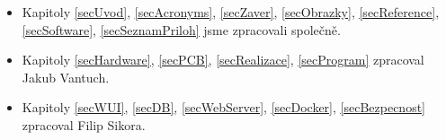 \documentclass[czech,12pt,a4paper]{article}
\begin{document}
\begin{itemize}
	\item Kapitoly \underline{\ref{secUvod}}, \underline{\ref{secAcronyms}}, \underline{\ref{secZaver}}, \underline{\ref{secObrazky}}, \underline{\ref{secReference}}, \underline{\ref{secSoftware}}, \underline{\ref{secSeznamPriloh}} jsme zpracovali společně. 
	\item Kapitoly \underline{\ref{secHardware}}, \underline{\ref{secPCB}}, \underline{\ref{secRealizace}}, \underline{\ref{secProgram}} zpracoval Jakub Vantuch.
	\item Kapitoly \underline{\ref{secWUI}}, \underline{\ref{secDB}}, \underline{\ref{secWebServer}}, \underline{\ref{secDocker}}, \underline{\ref{secBezpecnost}} zpracoval Filip Sikora.
\end{itemize}


\clearpage
\end{document}
